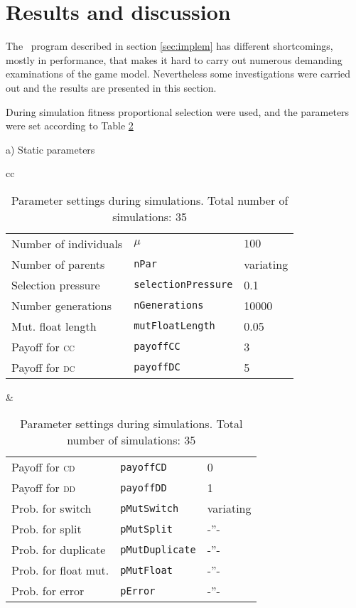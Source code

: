 \section{Results and discussion}\label{sec:results}
The \matlab\ program described in section \ref{sec:implem} has different shortcomings, mostly in performance, that makes it hard to carry out numerous demanding examinations of the game model. Nevertheless some investigations were carried out and the results are presented in this section.\mypar

During simulation fitness proportional selection were used, and the parameters were set according to Table \ref{tab:results:parameters}


\begin{table}[!hbtp]
  \footnotesize
  \centering
  \label{tab:results:parameters}
  \caption{Parameter settings during simulations. Total number of simulations: 35}

  a) Static parameters \myhalfpar

  \begin{tabular}{cc}
    \begin{tabular}{ll@{$~=~$}l}
      \hline
      Number of individuals        & $\mu$                      & $100$  \\
      Number of parents        & \texttt{nPar}              & variating \\
      Selection pressure     & \texttt{selectionPressure} & 0.1    \\
      Number generations     & \texttt{nGenerations}      & 10000  \\
      Mut. float length      & \texttt{mutFloatLength}    & 0.05   \\
      Payoff for \textsc{cc} & \texttt{payoffCC}          & 3      \\
      Payoff for \textsc{dc} & \texttt{payoffDC}          & 5      \\
      \hline
    \end{tabular}
    &
    \begin{tabular}{ll@{$~=~$}l}
      \hline
      Payoff for \textsc{cd} & \texttt{payoffCD}          & 0         \\
      Payoff for \textsc{dd} & \texttt{payoffDD}          & 1         \\
      Prob. for switch       & \texttt{pMutSwitch}        & variating \\
      Prob. for split        & \texttt{pMutSplit}         & -''-      \\
      Prob. for duplicate    & \texttt{pMutDuplicate}     & -''-      \\
      Prob. for float mut.   & \texttt{pMutFloat}         & -''-      \\
      Prob. for error        & \texttt{pError}            & -''-      \\
      \hline
    \end{tabular}
  \end{tabular}\mypar


\end{table}
